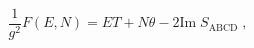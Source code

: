\begin{equation}
\label{2-2}
\frac{1}{g^2}F(E,N) = E T + N\theta - 2\mathrm{Im}\; S_\mathrm{ABCD}\;,
\end{equation}

